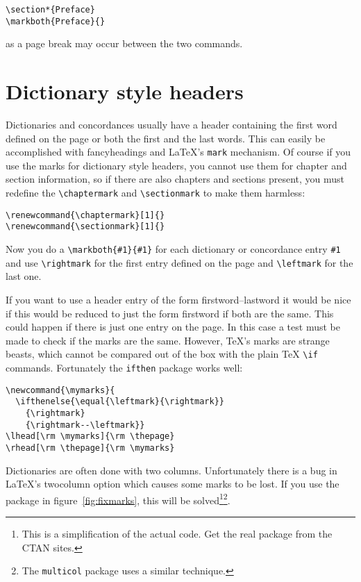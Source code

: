\documentclass{article}
\makeatletter
\def\latex/{\protect\LaTeX{}}
\def\tex/{\TeX}
\newcommand{\TTindex}[1]{\index{#1@\texttt{#1}}}
\makeatother
\begin{document}
\begin{verbatim}
\section*{Preface}
\markboth{Preface}{}
\end{verbatim}
as a page break may occur between the two commands.

\section{Dictionary style headers}

Dictionaries and concordances usually have a header containing the first
word defined on the page or both the first and the last words. This can
easily be accomplished with \textsf{fancyheadings} and \latex/'s
\texttt{mark} mechanism. Of course if you use the marks for dictionary
style headers, you cannot use them for chapter and section information, so
if there are also chapters and sections present, you must redefine the
\verb|\chaptermark| and \verb|\sectionmark| to make them harmless:

\begin{verbatim}
\renewcommand{\chaptermark}[1]{}
\renewcommand{\sectionmark}[1]{}
\end{verbatim}

Now you do a \verb|\markboth{#1}{#1}| for each dictionary or concordance
entry \verb|#1| and use \verb|\rightmark| for the first entry defined on
the page and \verb|\leftmark| for the last one.

If you want to use a header entry of the form \textsf{firstword--lastword}
it would be nice if this would be reduced to just the form
\textsf{firstword} if both are the same. This could happen if there is just
one entry on the page. In this case a test must be made to check if the
marks are the same.  However, \tex/'s marks are strange beasts, which
cannot be compared out of the box with the plain \tex/ \verb|\if| commands.
\TTindex{ifthen}
Fortunately the \texttt{ifthen} package works well:

\begin{verbatim}
\newcommand{\mymarks}{
  \ifthenelse{\equal{\leftmark}{\rightmark}}
    {\rightmark}
    {\rightmark--\leftmark}}
\lhead[\rm \mymarks]{\rm \thepage}
\rhead[\rm \thepage]{\rm \mymarks}
\end{verbatim}

Dictionaries are often done with two columns. Unfortunately there is a bug
in \latex/'s twocolumn option which causes some marks to be lost. If you
use the  package in figure~\ref{fig:fixmarks}, this will be
solved\footnote{This is a simplification of the  actual code. Get the real
  package from the CTAN sites.}\footnote{The
  \texttt{multicol} package uses a similar technique.}. 
\end{document}
